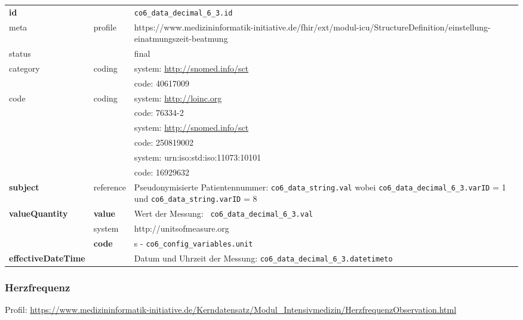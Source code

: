 \begin{longtable}{|l|l|p{7.5cm}|}
        \hline
        \rowcolor{lightgray} \multicolumn{3}{|l|}{Data Mapping (inhaltlich)} \\ \hline
        \textbf{id} &  & \texttt{co6\_data\_decimal\_6\_3.id} \\ \hline
	meta & profile & https://www.medizininformatik-initiative.de/fhir/ext/modul-icu/StructureDefinition/einstellung-einatmungszeit-beatmung \\ \hline 
	status &  & final   \\ \hline 
	category & coding & system: \url{http://snomed.info/sct} \\
	\cline{3-3}
	& & code: 40617009\\ \hline
	code & coding & system: \url{http://loinc.org} \\ 
	\cline{3-3} 
	&  & code: 76334-2 \\ 
	\cline{3-3} 
	&  & system: \url{http://snomed.info/sct} \\ 
	\cline{3-3} 
	&  & code: 250819002 \\ 
	\cline{3-3} 
	&  & system: urn:iso:std:iso:11073:10101 \\ 
	\cline{3-3}
	&  & code: 16929632 \\ \hline
	 \textbf{subject} & reference & Pseudonymisierte Patientennummer: \texttt{co6\_data\_string.val} wobei \texttt{co6\_data\_decimal\_6\_3.varID} = 1 und \texttt{co6\_data\_string.varID} = 8 \\ \hline
	 \textbf{valueQuantity}  & \textbf{value} & Wert der Messung: \texttt{
co6\_data\_decimal\_6\_3.val} \\
        \cline{2-3}
         & system & http://unitsofmeasure.org \\
         \cline{2-3}
         & \textbf{code} & s - \texttt{co6\_config\_variables.unit} \\ \hline
     \textbf{effectiveDateTime}  & & Datum und Uhrzeit der Messung: \texttt{co6\_data\_decimal\_6\_3.datetimeto} \\ \hline
\end{longtable}

\subsubsection{Herzfrequenz} 

Profil: \url{https://www.medizininformatik-initiative.de/Kerndatensatz/Modul_Intensivmedizin/HerzfrequenzObservation.html}


